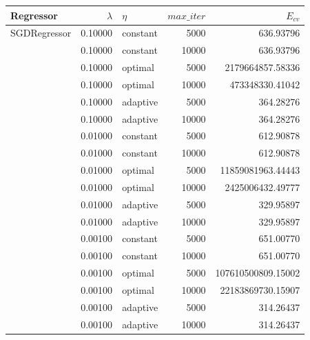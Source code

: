 \documentclass[a4paper, 20pt]{article}
\begin{document}
\begin{table}[h!]
\begin{tabular}{lrlrr}
Regressor                        & $\lambda$ & $\eta$   & $max\_iter$ & $E_{cv}$                \\ \hline
SGDRegressor                     & 0.10000   & constant & 5000        & 636.93796          \\
                                 & 0.10000   & constant & 10000       & 636.93796          \\
                                 & 0.10000   & optimal  & 5000        & 2179664857.58336   \\
                                 & 0.10000   & optimal  & 10000       & 473348330.41042    \\
                                 & 0.10000   & adaptive & 5000        & 364.28276          \\
                                 & 0.10000   & adaptive & 10000       & 364.28276          \\
                                 & 0.01000   & constant & 5000        & 612.90878          \\
                                 & 0.01000   & constant & 10000       & 612.90878          \\
                                 & 0.01000   & optimal  & 5000        & 11859081963.44443  \\
                                 & 0.01000   & optimal  & 10000       & 2425006432.49777   \\
                                 & 0.01000   & adaptive & 5000        & 329.95897          \\
                                 & 0.01000   & adaptive & 10000       & 329.95897          \\
                                 & 0.00100   & constant & 5000        & 651.00770          \\
                                 & 0.00100   & constant & 10000       & 651.00770          \\
                                 & 0.00100   & optimal  & 5000        & 107610500809.15002 \\
                                 & 0.00100   & optimal  & 10000       & 22183869730.15907  \\
                                 & 0.00100   & adaptive & 5000        & 314.26437          \\
                                 & 0.00100   & adaptive & 10000       & 314.26437          \\

\end{tabular}
\end{table}
\end{document}
